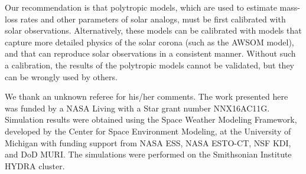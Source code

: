 \documentclass[apj]{emulateapj}
\begin{document}
Our recommendation is that polytropic models, which are used to estimate mass-loss rates and other parameters of solar analogs, must be first calibrated with solar observations. Alternatively, these models can be calibrated with models that capture more detailed physics of the solar corona (such as the AWSOM model), and that can reproduce solar observations in a consistent manner. Without such a calibration, the results of the polytropic models cannot be validated, but they can be wrongly used by others. 


\acknowledgments

We thank an unknown referee for his/her comments. The work presented here was funded by a NASA Living with a Star grant number NNX16AC11G. Simulation results were obtained using the Space Weather Modeling Framework, developed by the Center for Space Environment Modeling, at the University of Michigan with funding support from NASA ESS, NASA ESTO-CT, NSF KDI, and DoD MURI. The simulations were performed on the Smithsonian Institute HYDRA cluster. 





%
%


\begin{table*}[h!]
\caption {Simulations Global Parameters of the Solar Corona} \label{tab:table1}
\label{table:t1}
\end{table*}
\end{document}
